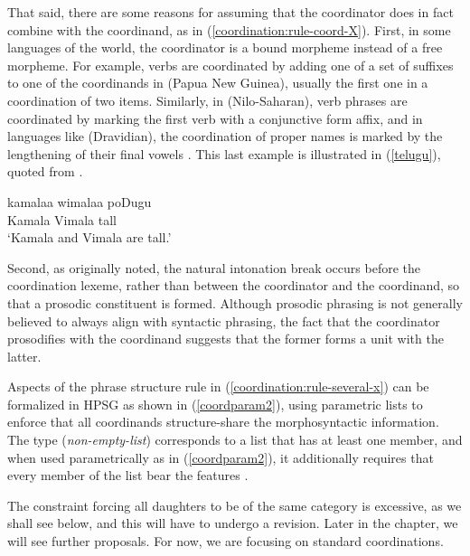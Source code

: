 That said, there are some reasons for assuming that the coordinator does in fact combine with the
coordinand, as in (\ref{coordination:rule-coord-X}). First, in some languages of the world, the
coordinator is a bound morpheme instead of a free morpheme. For example, verbs are coordinated by
adding one of a set of suffixes to one of the coordinands in  (Papua New Guinea),
usually the first one in a coordination of two items.
Similarly, in  (Nilo-Saharan), verb phrases are coordinated by marking the first verb
with a conjunctive form affix, and in languages like  (Dravidian), the coordination of
proper names is marked by the lengthening of their final vowels \citep[]{Drellishak:Bender:05}. This last example is illustrated in (\ref{telugu}), quoted from
.

\ea
\label{telugu}
\gll kamalaa wimalaa poDugu \\ 
     Kamala Vimala tall\\
\glt `Kamala and Vimala are tall.'
\z



Second, as \citet[165]{ross67} originally noted, the natural intonation break occurs before the
coordination lexeme, rather than between the coordinator and the coordinand, so that a  prosodic
constituent is formed. Although prosodic phrasing is not generally believed to always align with
syntactic phrasing, the fact that the coordinator prosodifies with the  coordinand suggests that the
former forms a unit with the latter. 

 Aspects of the phrase structure rule in (\ref{coordination:rule-several-x}) can be formalized in HPSG as
 shown in  (\ref{coordparam2}),  using parametric lists  \citep[, fn.\,2]{pollardsag} to enforce
 that all coordinands structure-share the morphosyntactic information. The type  (\textit{non-empty-list}) corresponds
 to a list that has at least one member, and when used parametrically as in (\ref{coordparam2}), it additionally requires that
 every member of the list bear the features
 .

\ea 
{}
\label{coordparam2}
\z

\noindent
The constraint forcing all daughters to be of the same category is excessive, as we shall see below,
and this will have to undergo a revision. Later in the chapter, we will see further proposals. For
now, we are focusing on standard coordinations. 

